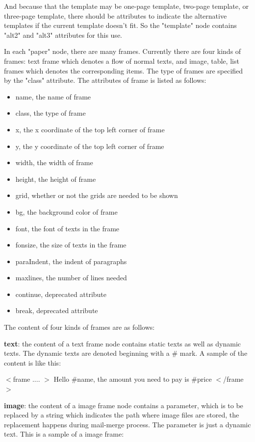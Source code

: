 \documentclass[12pt,twoside,a4paper]{report}
\begin{document}
  And because that the template may be one-page template, two-page template, or three-page template, there should be attributes to indicate the alternative templates if the current template doesn't fit. So the "template" node contains "alt2" and "alt3" attributes for this use.

  In each "paper" node, there are many frames. Currently there are four kinds of frames: text frame which denotes a flow of normal texts, and image, table, list frames which denotes the corresponding items. The type of frames are specified by the "class" attribute. The attributes of frame is listed as follows:

\begin{itemize}
\item name, the name of frame
\item class, the type of frame
\item x, the x coordinate of the top left corner of frame
\item y, the y coordinate of the top left corner of frame
\item width, the width of frame
\item height, the height of frame
\item grid, whether or not the grids are needed to be shown
\item bg, the background color of frame
\item font, the font of texts in the frame
\item fonsize, the size of texts in the frame
\item paraIndent, the indent of paragraphs
\item maxlines, the number of lines needed
\item continue, deprecated attribute
\item break, deprecated attribute
\end{itemize}

  The content of four kinds of frames are as follows:

  \textbf{text}: the content of a text frame node contains static texts as well as dynamic texts. The dynamic texts are denoted beginning with a \# mark. A sample of the content is like this: 

  $<$frame .... $>$ Hello \#name, the amount you need to pay is \#price $<$/frame$>$

  \textbf{image}: the content of a image frame node contains a parameter, which is to be replaced by a string which indicates the path where image files are stored, the replacement happens during mail-merge process. The parameter is just a dynamic text. This is a sample of a image frame:
\end{document}
